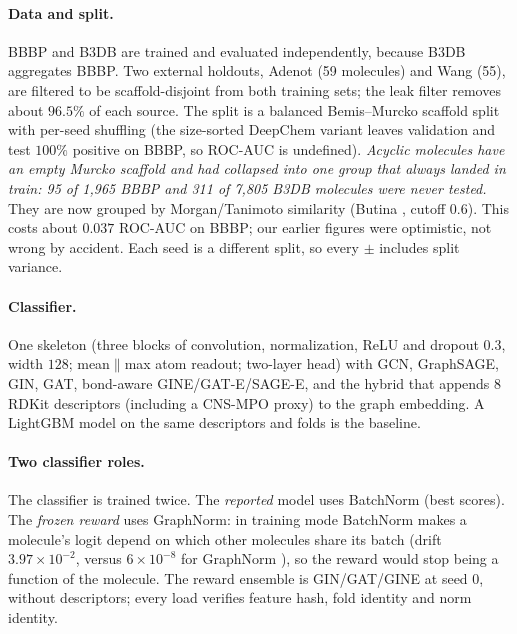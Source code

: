 \documentclass[10pt,letterpaper]{article}
\begin{document}
\paragraph{Data and split.} BBBP \cite{martins2012} and B3DB \cite{meng2021} are trained and evaluated independently, because B3DB aggregates BBBP. Two external holdouts, Adenot \cite{adenot2004} (59 molecules) and Wang \cite{wang2018} (55), are filtered to be scaffold-disjoint from both training sets; the leak filter removes about $96.5\%$ of each source. The split is a balanced Bemis--Murcko scaffold split with per-seed shuffling (the size-sorted DeepChem variant leaves validation and test $100\%$ positive on BBBP, so ROC-AUC is undefined). \emph{Acyclic molecules have an empty Murcko scaffold and had collapsed into one group that always landed in train: 95 of 1{,}965 BBBP and 311 of 7{,}805 B3DB molecules were never tested.} They are now grouped by Morgan/Tanimoto similarity (Butina \cite{butina1999}, cutoff 0.6). This costs about $0.037$ ROC-AUC on BBBP; our earlier figures were optimistic, not wrong by accident. Each seed is a different split, so every $\pm$ includes split variance.

\paragraph{Classifier.} One skeleton (three blocks of convolution, normalization, ReLU and dropout $0.3$, width $128$; mean$\|$max atom readout; two-layer head) with GCN, GraphSAGE, GIN, GAT, bond-aware GINE/GAT-E/SAGE-E, and the hybrid that appends 8 RDKit descriptors (including a CNS-MPO proxy) to the graph embedding. A LightGBM model on the same descriptors and folds is the baseline.

\paragraph{Two classifier roles.} The classifier is trained twice. The \emph{reported} model uses BatchNorm (best scores). The \emph{frozen reward} uses GraphNorm: in training mode BatchNorm makes a molecule's logit depend on which other molecules share its batch (drift $3.97\times10^{-2}$, versus $6\times10^{-8}$ for GraphNorm \cite{cai2021}), so the reward would stop being a function of the molecule. The reward ensemble is GIN/GAT/GINE at seed 0, without descriptors; every load verifies feature hash, fold identity and norm identity.
\end{document}
